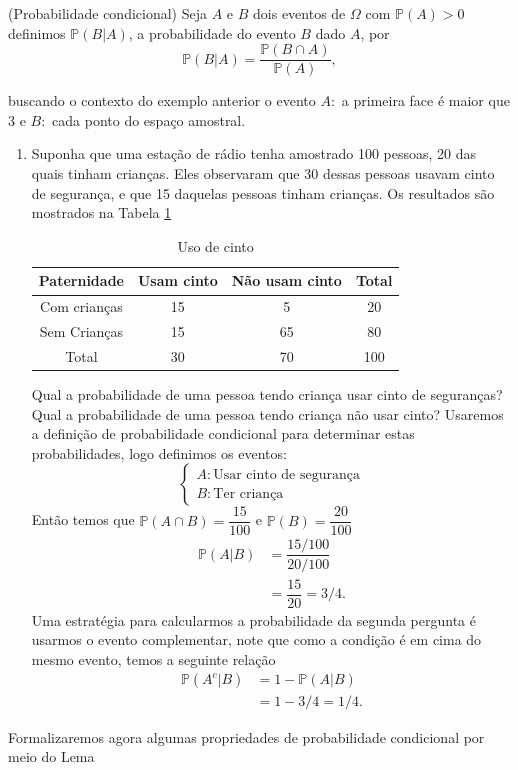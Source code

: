 \begin{defin}{(Probabilidade condicional)}
    Seja $A$ e $B$ dois eventos de $\Omega$ com $\mathbb{P}(A) > 0$ definimos $\mathbb{P}(B|A)$, a probabilidade do evento $B$ dado $A$, por
    \begin{equation}
        \mathbb{P}(B|A) = \dfrac{\mathbb{P}(B\cap A)}{\mathbb{P}(A)},
    \end{equation}
\end{defin}
buscando o contexto do exemplo anterior o evento $A:$ a primeira face é maior que 3 e $B:$ cada ponto do espaço amostral.

\exemplo
\begin{enumerate}
    \item [(i)] Suponha que uma estação de rádio tenha amostrado 100 pessoas, 20 das quais tinham crianças. Eles observaram que 30 dessas pessoas usavam cinto de segurança, e que 15 daquelas pessoas tinham crianças. Os resultados são mostrados na Tabela \ref{cinto}
    
    \begin{table}[H]
        \centering
        \caption{Uso de cinto}
        \label{cinto}
        \begin{tabular}{|c|c|c|c|}
	    \hline
	    Paternidade & Usam cinto & Não usam cinto & Total\\
	    \hline
	        Com crianças & 15 & 5 & 20\\
	        Sem Crianças & 15 & 65 & 80\\
	        Total & 30 & 70 & 100\\
	        \hline
        \end{tabular}
\end{table}
    Qual a probabilidade de uma pessoa tendo criança usar cinto de seguranças? Qual a probabilidade de uma pessoa tendo criança não usar cinto? Usaremos a definição de probabilidade condicional para determinar estas probabilidades, logo definimos os eventos:
    \begin{equation}
        \begin{cases}
            A: \text{Usar cinto de segurança}\\
            B: \text{Ter criança}
        \end{cases}
    \end{equation}
    Então temos que $\mathbb{P}(A \cap B) = \dfrac{15}{100}$ e $\mathbb{P}(B) = \dfrac{20}{100}$ 
\begin{align*}
    \mathbb{P}(A|B) &= \dfrac{15/100}{20/100} \\ 
    &=\dfrac{15}{20} = 3/4.
\end{align*}
Uma estratégia para calcularmos a probabilidade da segunda pergunta é usarmos o evento complementar, note que como a condição é em cima do mesmo evento, temos a seguinte relação
    \begin{align*}
        \mathbb{P}(A^c|B) &= 1 - \mathbb{P}(A|B)\\
        &= 1 - 3/4 = 1/4.
    \end{align*}
\end{enumerate}	
Formalizaremos agora algumas propriedades de probabilidade condicional por meio do Lema

